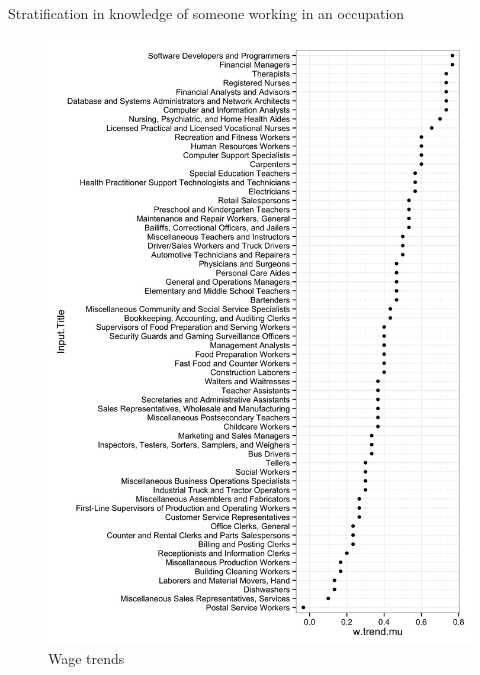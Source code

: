 \documentclass[11pt]{article}
\begin{document}
\begin{table}
\centering 
\caption{Stratification in knowledge of someone working in an occupation \label{tab:clustering}}
 
\end{table} 


\begin{figure}
\caption{Wage trends} 
\centering
\begin{minipage}{0.85 \linewidth}
\includegraphics[width = \linewidth]{./plots/wage_trends.png}
\end{minipage}  
\end{figure} 




%
%





\end{document}
